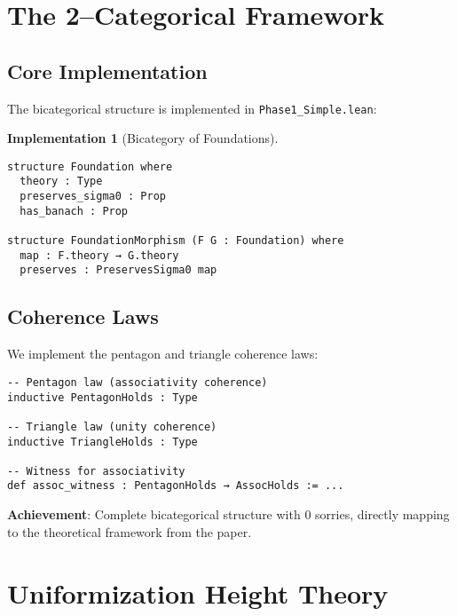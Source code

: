 \documentclass[11pt]{article}
\theoremstyle{definition}
\newtheorem{implementation}[theorem]{Implementation}
\theoremstyle{remark}
\newcommand{\lean}[1]{\texttt{#1}}
\begin{document}
\section{The 2--Categorical Framework}

\subsection{Core Implementation}

The bicategorical structure is implemented in \lean{Phase1\_Simple.lean}:

\begin{implementation}[Bicategory of Foundations]
\begin{lstlisting}[language={}]
structure Foundation where
  theory : Type
  preserves_sigma0 : Prop
  has_banach : Prop

structure FoundationMorphism (F G : Foundation) where
  map : F.theory → G.theory
  preserves : PreservesSigma0 map
\end{lstlisting}
\end{implementation}

\subsection{Coherence Laws}

We implement the pentagon and triangle coherence laws:

\begin{lstlisting}[language={}]
-- Pentagon law (associativity coherence)
inductive PentagonHolds : Type

-- Triangle law (unity coherence)  
inductive TriangleHolds : Type

-- Witness for associativity
def assoc_witness : PentagonHolds → AssocHolds := ...
\end{lstlisting}

\begin{mdframed}[style=achievement]
\textbf{Achievement}: Complete bicategorical structure with 0 sorries, directly mapping to the theoretical framework from the paper.
\end{mdframed}

\section{Uniformization Height Theory}
\end{document}
